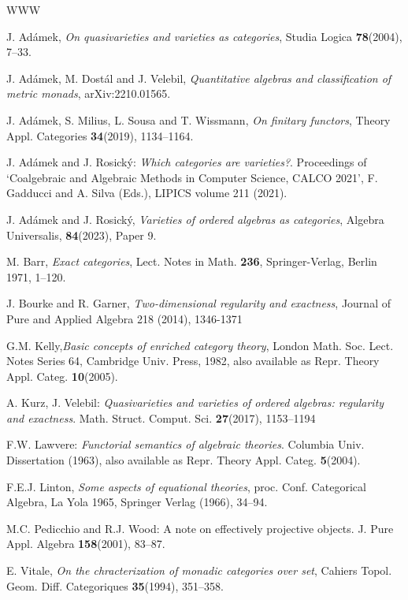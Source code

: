 \documentclass[12pt,amstex,leqno]{amsart}
\theoremstyle{definition}
\numberwithin{equation}{section}
\begin{document}
\begin{thebibliography}{WWW}

 J. Ad\'{a}mek, \emph{On quasivarieties and varieties as categories}, Studia Logica \textbf{78}(2004), 7--33.

 J. Ad\'{a}mek, M. Dost\'{a}l and J. Velebil, \emph{Quantitative algebras and classification of metric monads}, arXiv:2210.01565.

 J. Ad\'{a}mek, S. Milius, L. Sousa and T. Wissmann, \emph{On finitary functors}, Theory Appl. Categories \textbf{34}(2019), 1134--1164.

J. Ad{\'{a}}mek and J. Rosick\' y: \emph{Which categories are varieties?}. Proceedings of `Coalgebraic and Algebraic Methods in Computer Science, CALCO 2021', F. Gadducci and A. Silva (Eds.), LIPICS volume 211 (2021).

 J. Ad\'{a}mek and J. Rosick\'{y}, \emph{Varieties of ordered algebras as categories}, Algebra Universalis, {\bf 84}(2023), Paper 9.

 M. Barr, \emph{Exact categories}, Lect. Notes in Math. {\bf 236}, Springer-Verlag, Berlin 1971, 1--120.
 
 J. Bourke and R. Garner, \emph{Two-dimensional regularity and exactness}, Journal of Pure and Applied Algebra 218 (2014), 1346-1371

 G.M. Kelly,\emph{Basic concepts of enriched category theory}, London Math. Soc. Lect. Notes Series 64, Cambridge Univ. Press, 1982, also available as Repr. Theory Appl. Categ. {\bf 10}(2005).


 A. Kurz, J. Velebil: \emph{Quasivarieties and varieties of ordered algebras: regularity and exactness}.  Math. Struct. Comput. Sci. 
\textbf{27}(2017), 1153--1194 

 F.W. Lawvere: \emph{Functorial semantics of algebraic theories}. Columbia Univ.  Dissertation (1963), also available as Repr. Theory Appl. Categ. {\bf 5}(2004).

 F.E.J. Linton, \emph{Some aspects of equational theories}, proc. Conf. Categorical Algebra, La Yola 1965, Springer Verlag (1966), 34--94.

 M.C. Pedicchio and R.J. Wood: {A note on effectively projective objects}. J. Pure Appl. Algebra \textbf{158}(2001),  83--87.

 E. Vitale, \emph{On the chracterization of monadic categories over set}, Cahiers Topol. Geom. Diff. Categoriques \textbf{35}(1994), 351--358.

\end{thebibliography}
 





 
 
\end{document}
